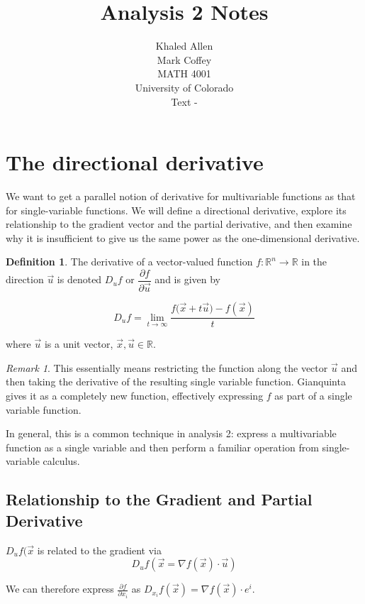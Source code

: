 \documentclass[12pt]{article}
\newcommand{\R}{\mathbb{R}}
\theoremstyle{definition}
\newtheorem{definition}{Definition}[section]
\theoremstyle{remark}
\newtheorem*{remark}{Remark}
\begin{document}
\date{}

 
\title{Analysis 2 Notes}
\author{Khaled Allen\\Mark Coffey \\
MATH 4001\\University of Colorado\\ Text - } 
 
\maketitle
\section{The directional derivative}
We want to get a parallel notion of derivative for multivariable functions as that for single-variable functions. We will define a directional derivative, explore its relationship to the gradient vector and the partial derivative, and then examine why it is insufficient to give us the same power as the one-dimensional derivative.
\begin{definition}
The derivative of a vector-valued function $f:\R^n\to\R$ in the direction $\vec{u}$ is denoted $D_u f$ or $\dfrac{\partial f}{\partial \vec{u}}$ and is given by

$$D_u f=\lim_{t\to\infty}\frac{f(\vec{x}+t{\vec{u})}-f(\vec{x})}{t}$$

where $\vec{u}$ is a unit vector, $\vec{x},\vec{u}\in\R$.
\end{definition} 

\begin{remark}
This essentially means restricting the function along the vector $\vec{u}$ and then taking the derivative of the resulting single variable function. Gianquinta gives it as a completely new function, effectively expressing $f$ as part of a single variable function.

In general, this is a common technique in analysis 2: express a multivariable function as a single variable and then perform a familiar operation from single-variable calculus.
\end{remark}

\subsection{Relationship to the Gradient and Partial Derivative}
$D_u f(\vec{x}$ is related to the gradient via
$$D_u f(\vec{x}=\nabla f(\vec{x})\cdot \vec{u})$$

We can therefore express $\frac{\partial f}{\partial x_i}$ as $D_{x_i}f(\vec{x})=\nabla f(\vec{x})\cdot e^i$.
\end{document}
